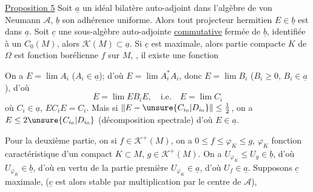 \uline{Proposition 5} Soit $\underline a$ un idéal bilatère auto-adjoint dans l'algèbre de von Neumann $\mathcal A$, $\underline b$ son adhérence uniforme. Alors tout projecteur hermitien $E\in\underline b$ est dans $\underline a$.  Soit $\underline c$ une sous-algèbre auto-adjointe \uline{commutative}  fermée de $\underline b$, identifiée à un $C_0(M)$, alors  $\mathcal K(M)\subset\underline a$. Si $\underline c$ est maximale, alors  partie compacte $K$ de $\Omega$ est   fonction borélienne    $f$ sur $M$, , il existe une fonction    

On a $E=\lim A_i$ ($A_i\in\underline a$); d'où $E=\lim A_i^*A_i$, donc $E=\lim B_i$ ($B_i\geq0$, $B_i\in\underline a$), d'où
\[
E=\lim EB_iE,\quad\text{i.e.}\quad E=\lim C_i
\]
où $C_i\in\underline a$, $EC_iE=C_i$.  Mais si $\|E-\unsure{C_{i_0}|D_{i_0}}\|\leq\frac12$, on a $E\leq2\unsure{C_{i_0}|D_{i_0}}$ (décomposition spectrale) d'où $E\in\underline a$.


Pour la deuxième partie, on   si $f\in\mathcal K^+(M)$, on a $0\leq f\leq\varphi_K\leq g$, $\varphi_K$ fonction caractéristique d'un compact $K\subset M$, $g\in\mathcal K^+(M)$. On a $U_{\varphi_K}\leq U_g\in\underline b$, d'où $U_{\varphi_K}\in\underline b$, d'où en vertu de la partie première $U_{\varphi_K}\in\underline a$, d'où $U_f\in\underline a$. Supposons $\underline c$ maximale, ($\underline c$ est alors stable par multiplication par le centre de $\mathcal A$), 
